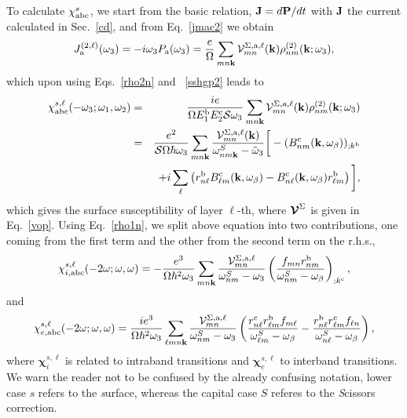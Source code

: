 \documentclass[floatfix,prb,aps,superscriptaddress,11pt,preprint]{revtex4}
\begin{document}
To calculate $\chi_{\mathrm{a}\mathrm{b}\mathrm{c}}^s$,
we start from the basic relation, $\mathbf{J}=d\mathbf{P}/dt$ 
with $\mathbf{J}$ the current calculated in Sec.~\ref{cd}, and
from Eq.~\eqref{jmac2} we obtain
\begin{equation}\label{Pjikn}
J_{\mathrm{a}}^{(2,\ell)}(\omega_3)=-i\omega_3P_{\mathrm{a}}(\omega_3)
=\frac{e}{\Omega}
\sum_{mn\mathbf{k}}
{\mathbf{\cal V}}^{\Sigma,\mathrm{a},\ell}_{mn}(\mathbf{k})
\rho^{(2)}_{nm}(\mathbf{k};\omega_3)
,
\end{equation}
which upon using Eqs.~\eqref{rho2n} and ~\eqref{sshgp2} leads to
\begin{eqnarray}\label{Pjikn2}
\chi^{s,\ell}_{\mathrm{a}\mathrm{b}\mathrm{c}}(-\omega_3;\omega_1,\omega_2)
&=&
\frac{ie}{\Omega E^{\mathrm{b}}_1E^{\mathrm{c}}_2{\cal S} \omega_3}
\sum_{mn\mathbf{k}}
{\mathbf{\cal V}}^{\Sigma,\mathrm{a},\ell}_{mn}(\mathbf{k})
\rho^{(2)}_{nm}(\mathbf{k};\omega_3)
\nonumber \\
&=&
\frac{e^2}{{\cal S}\Omega\hbar\omega_3}
\sum_{mn\mathbf{k}}
\frac{{\mathbf{\cal V}}^{\Sigma,\mathrm{a},\ell}_{mn}(\mathbf{k})}
{\omega^S_{nm\mathbf{k}}-\tilde\omega_3}
\bigg[
-(B_{nm}^{\mathrm{c}}(\mathbf{k},\omega_\beta))_{;k^{\mathrm{b}}}
\nonumber \\
&&
+i\sum_\ell\left(r_{n\ell}^{\mathrm{b}}B_{\ell m}^{\mathrm{c}}(\mathbf{k},\omega_\beta) -
  B_{n\ell}^{\mathrm{c}}(\mathbf{k},\omega_\beta) 
  r_{\ell m}^{\mathrm{b}}\right)
\bigg]
,
\end{eqnarray}
which gives the surface susceptibility of layer $\ell$-th, where 
$\boldsymbol{\mathcal{\cal V}}^\Sigma$ is given in Eq.~\eqref{vop}.
Using Eq.~\eqref{rho1n}, we
split above equation into
two contributions, one coming from the first term and the other
from the second term on the r.h.s.,
\begin{equation}\label{chii}
\chi_{i,\mathrm{a}\mathrm{b}\mathrm{c}}^{s,\ell}
(-2\omega;\omega,\omega)
=-\frac{e^3}{\Omega\hbar^2\omega_3}\sum_{mn\mathbf{k}}
\frac{{\mathbf{\cal V}}_{mn}^{\Sigma,\mathrm{a},\ell}}{\omega^S_{nm}-\omega_3}
\left(\frac{f_{mn}r_{nm}^{\mathrm{b}}}{\omega^S_{nm}-\omega_\beta}\right)_{;k^{\mathrm{c}}},
\end{equation} 
and
\begin{equation}\label{chie}
\chi_{e,\mathrm{a}\mathrm{b}\mathrm{c}}^{s,\ell}
(-2\omega;\omega,\omega)
=\frac{ie^3}{\Omega\hbar^2\omega_3}\sum_{\ell mn\mathbf{k}}
\frac{{\mathbf{\cal V}}_{mn}^{\Sigma,\mathrm{a},\ell}}{\omega^S_{nm}-\omega_3}
\left(
\frac{r_{n\ell}^{\mathrm{c}} r_{\ell m}^{\mathrm{b}} 
f_{m\ell}}{\omega^S_{\ell m}-\omega_\beta}
-\frac{r_{n\ell}^{\mathrm{b}} r_{\ell m}^{\mathrm{c}} 
f_{\ell n}}{\omega^S_{n \ell}-\omega_\beta}
\right),
\end{equation} 
where $\boldsymbol{\chi}^{s,\ell}_i$
 is related to intraband transitions and
$\boldsymbol{\chi}^{s,\ell}_e$
to interband transitions. We warn the reader not to be confused by the
already confusing notation, lower case $s$ refers to the 
{\it s}urface, whereas the capital case $S$ referes to the {\it S}cissors correction.   
\end{document}

